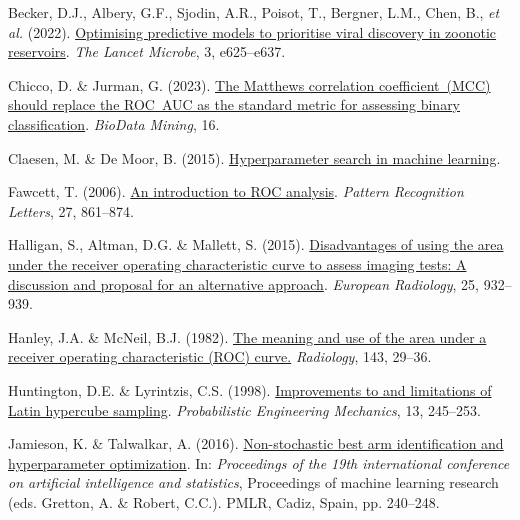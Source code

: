 \documentclass[
  letterpaper,
]{scrbook}
\newlength{\cslhangindent}
\newenvironment{CSLReferences}[2] %
 {\begin{list}{}{%
  \setlength{\itemindent}{0pt}
  \setlength{\leftmargin}{0pt}
  \setlength{\parsep}{0pt}
  \ifodd #1
   \setlength{\leftmargin}{\cslhangindent}
   \setlength{\itemindent}{-1\cslhangindent}
  \fi
  \setlength{\itemsep}{#2\baselineskip}}}
 {\end{list}}
\begin{document}
\label{refs-7}
\begin{CSLReferences}{1}{0}
Becker, D.J., Albery, G.F., Sjodin, A.R., Poisot, T., Bergner, L.M.,
Chen, B., \emph{et al.} (2022).
\href{https://doi.org/10.1016/s2666-5247(21)00245-7}{Optimising
predictive models to prioritise viral discovery in zoonotic reservoirs}.
\emph{The Lancet Microbe}, 3, e625--e637.

Chicco, D. \& Jurman, G. (2023).
\href{https://doi.org/10.1186/s13040-023-00322-4}{The Matthews
correlation coefficient~(MCC) should replace the ROC~AUC as the standard
metric for assessing binary classification}. \emph{BioData Mining}, 16.

Claesen, M. \& De Moor, B. (2015).
\href{https://doi.org/10.48550/ARXIV.1502.02127}{Hyperparameter search
in machine learning}.

Fawcett, T. (2006).
\href{https://doi.org/10.1016/j.patrec.2005.10.010}{An introduction to
ROC analysis}. \emph{Pattern Recognition Letters}, 27, 861--874.

Halligan, S., Altman, D.G. \& Mallett, S. (2015).
\href{https://doi.org/10.1007/s00330-014-3487-0}{Disadvantages of using
the area under the receiver operating characteristic curve to assess
imaging tests: A discussion and proposal for an alternative approach}.
\emph{European Radiology}, 25, 932--939.

Hanley, J.A. \& McNeil, B.J. (1982).
\href{https://doi.org/10.1148/radiology.143.1.7063747}{The meaning and
use of the area under a receiver operating characteristic (ROC) curve.}
\emph{Radiology}, 143, 29--36.

Huntington, D.E. \& Lyrintzis, C.S. (1998).
\href{https://doi.org/10.1016/s0266-8920(97)00013-1}{Improvements to and
limitations of Latin hypercube sampling}. \emph{Probabilistic
Engineering Mechanics}, 13, 245--253.

Jamieson, K. \& Talwalkar, A. (2016).
\href{https://proceedings.mlr.press/v51/jamieson16.html}{Non-stochastic
best arm identification and hyperparameter optimization}. In:
\emph{Proceedings of the 19th international conference on artificial
intelligence and statistics}, Proceedings of machine learning research
(eds. Gretton, A. \& Robert, C.C.). PMLR, Cadiz, Spain, pp. 240--248.


\end{CSLReferences}
\end{document}
